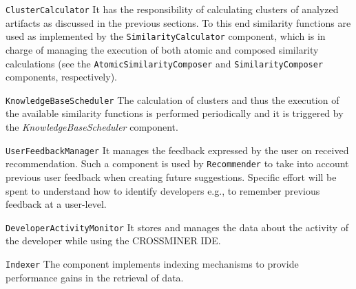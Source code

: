 \texttt{ClusterCalculator} It has the responsibility of calculating clusters of analyzed artifacts as discussed in the previous sections. To this end similarity functions are used as implemented by the  \texttt{SimilarityCalculator} component, which is in charge of managing the execution of both atomic and composed similarity calculations (see the \texttt{AtomicSimilarityComposer} and
\texttt{SimilarityComposer} components, respectively).

\texttt{KnowledgeBaseScheduler} The calculation of clusters and thus the execution of the available similarity functions is performed periodically and it is triggered by the \textit{KnowledgeBaseScheduler} component.


\texttt{UserFeedbackManager} It manages the feedback expressed by the user on received recommendation. Such a component is used by \texttt{Recommender} to take into account previous user feedback when creating future suggestions. Specific effort will be spent to understand how to identify developers e.g., to remember previous feedback at a user-level.

\texttt{DeveloperActivityMonitor} It stores and manages the data about the activity of the developer while using the CROSSMINER IDE.

\texttt{Indexer} The component implements indexing mechanisms to provide performance gains in the retrieval of data.